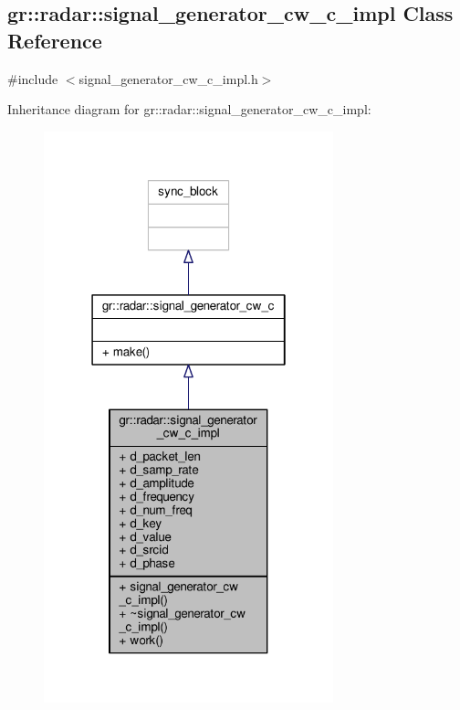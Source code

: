 \subsection{gr\+:\+:radar\+:\+:signal\+\_\+generator\+\_\+cw\+\_\+c\+\_\+impl Class Reference}
\label{classgr_1_1radar_1_1signal__generator__cw__c__impl}


{\ttfamily \#include $<$signal\+\_\+generator\+\_\+cw\+\_\+c\+\_\+impl.\+h$>$}



Inheritance diagram for gr\+:\+:radar\+:\+:signal\+\_\+generator\+\_\+cw\+\_\+c\+\_\+impl\+:
\nopagebreak
\begin{figure}[H]
\begin{center}
\leavevmode
\includegraphics[width=238pt]{d9/daf/classgr_1_1radar_1_1signal__generator__cw__c__impl__inherit__graph}
\end{center}
\end{figure}


